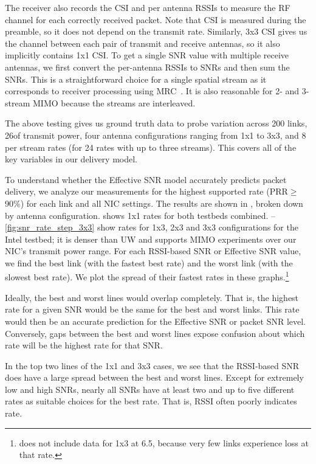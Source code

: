 The receiver also records the CSI and per antenna RSSIs to measure the RF channel for each correctly received packet. Note that CSI is measured during the preamble, so it does not depend on the transmit rate. Similarly, 3x3 CSI gives us the channel between each pair of transmit and receive antennas, so it also implicitly contains 1x1 CSI\@. To get a single SNR value with multiple receive antennas, we first convert the per-antenna RSSIs to SNRs and then sum the SNRs.
This is a straightforward choice for a single spatial stream as it corresponds to receiver processing using MRC~\cite{Goldsmith}.
It is also reasonable for 2- and 3-stream MIMO because the streams are interleaved.

The above testing gives us ground truth data to probe variation across 200 links, 26\dB of transmit power, four antenna configurations ranging from 1x1 to 3x3, and 8 per stream rates (for 24 rates with up to three streams). This covers all of the key variables in our delivery model.

 To understand whether the Effective SNR model accurately predicts packet delivery, we analyze our measurements for the highest supported rate (PRR$\geq$ 90\%) for each link and all NIC settings. The results are shown in , broken down by antenna configuration.  shows 1x1 rates for both testbeds combined. --\ref{fig:snr_rate_step_3x3}  show rates for 1x3, 2x3 and 3x3 configurations for the Intel testbed; it is denser than UW and supports MIMO experiments over our NIC's transmit power range.
For each RSSI-based SNR or Effective SNR value, we find the best link (with the fastest best rate) and the worst link (with the slowest best rate). We plot the spread of their fastest rates in these graphs.\footnote{ does not include data for 1x3 at 6.5\Mbps, because very few links experience loss at that rate.}

Ideally, the best and worst lines would overlap completely. %
That is, the highest rate for a given SNR would be the same for the best and worst links. This rate would then be an accurate prediction for the Effective SNR or packet SNR level. Conversely, gaps between the best and worst lines expose confusion about which rate will be the highest rate for that SNR\@.

In the top two lines of the 1x1 and 3x3 cases, we see that the RSSI-based SNR does have a large spread between the best and worst lines. Except for extremely low and high SNRs, nearly all SNRs have at least two and up to five different rates as suitable choices for the best rate. That is, RSSI often poorly indicates rate.

